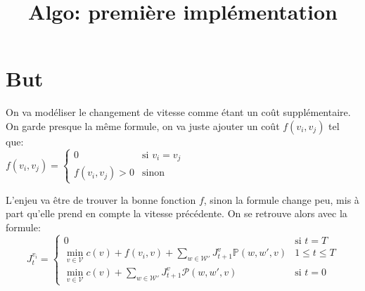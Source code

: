 \documentclass[10pt,a4paper]{article}
\title{Algo: première implémentation}
\newcommand{\W}{\mathcal{W}}
\newcommand{\V}{\mathcal{V}}
\begin{document}
\maketitle

\section{But}
On va modéliser le changement de vitesse comme étant un coût
supplémentaire. On garde presque la même formule, on va juste ajouter
un coût $f(v_i,v_j)$ tel que:\\
$f(v_i,v_j)=
\begin{cases}
  0 & \text{si } v_i=v_j \\
  f(v_i,v_j)>0 & \text{sinon}
\end{cases}
$

L'enjeu va être de trouver la bonne fonction $f$, sinon la formule
change peu, mis à part qu'elle prend en compte la vitesse
précédente. On se retrouve alors avec la formule:
\begin{equation}
  J_t^{v_i} =
  \begin{cases}
    0 & \text{si } t=T\\
    \min_{v\in\V}
    c(v)+f(v_i,v)+\sum_{w\in\W'}J_{t+1}^v\mathbb{P}(w,w',v) & 1\leq
    t\leq T\\
        \min_{v\in\V}
    c(v)+\sum_{w\in\W'}J_{t+1}^v\mathcal{P}(w,w',v) & \text{si }t=0

  \end{cases}
\end{equation}
\end{document}
